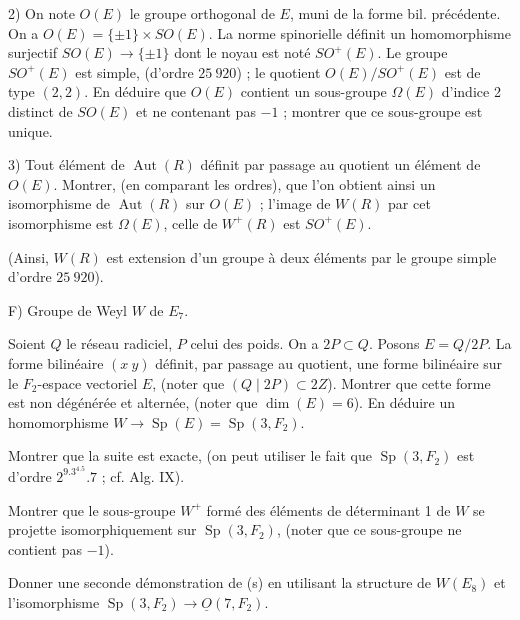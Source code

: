 2) On note $O(E)$ le groupe orthogonal de $E$, muni de la forme bil. précédente. On a $O(E)=\{\pm1\}\times SO(E)$. La norme spinorielle définit un homomorphisme surjectif $SO(E)\longrightarrow\{\pm1\}$ dont le noyau est noté $SO^+(E)$. Le groupe $SO^+(E)$ est simple, (d'ordre $25\ 920$) ; le quotient $O(E)/SO^+(E)$ est de type $(2,2)$. En déduire que $O(E)$ contient un sous-groupe $\Omega(E)$ d'indice 2 distinct de $SO(E)$ et ne contenant pas $-1$ ; montrer que ce sous-groupe est unique.

3) Tout élément de $\operatorname{Aut}(R)$ définit par passage au quotient un élément de $O(E)$. Montrer, (en comparant les ordres), que l'on obtient ainsi un isomorphisme de $\operatorname{Aut}(R)$ sur $O(E)$ ; l'image de $W(R)$ par cet isomorphisme est $\Omega(E)$, celle de $W^+(R)$ est $SO^+(E)$.

(Ainsi, $W(R)$ est extension d'un groupe à deux éléments par le groupe simple d'ordre $25\ 920$).

F) Groupe de Weyl $W$ de $E_7$.

Soient $Q$ le réseau radiciel, $P$ celui des poids. On a $2P\subset Q$. Posons $E=Q/2P$. La forme bilinéaire $(x\ y)$ définit, par passage au quotient, une forme bilinéaire sur le $F_2$-espace vectoriel $E$, (noter que $(Q\mid 2P)\subset 2Z$). Montrer que cette forme est non dégénérée et alternée, (noter que $\dim(E)=6$). En déduire un homomorphisme $W\longrightarrow\operatorname{Sp}(E)=\operatorname{Sp}(3,F_2)$.

Montrer que la suite
est exacte, (on peut utiliser le fait que $\operatorname{Sp}(3,F_2)$ est d'ordre $2^9.3^4.5.7$ ; cf. Alg. IX).

Montrer que le sous-groupe $W^+$ formé des éléments de déterminant 1 de $W$ se projette isomorphiquement sur $\operatorname{Sp}(3,F_2)$, (noter que ce sous-groupe ne contient pas $-1$).

Donner une seconde démonstration de (s) en utilisant la structure de $W(E_8)$ et l'isomorphisme $\operatorname{Sp}(3,F_2)\longrightarrow\underline{O}(7,F_2)$.




